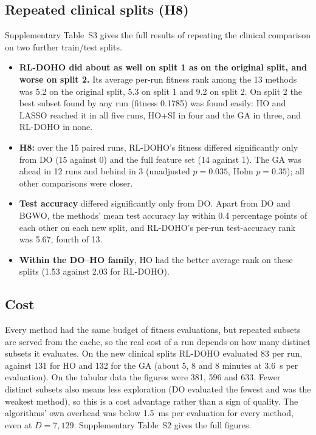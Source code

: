 \documentclass[journal]{IEEEtran}
\begin{document}
\subsection{Repeated clinical splits (H8)}\label{sec:splits}
Supplementary Table~S3 gives the full results of repeating the clinical comparison on two further train/test splits.
\begin{itemize}
\item \textbf{RL-DOHO did about as well on split 1 as on the original split, and worse on split 2.} Its average per-run fitness rank among the 13 methods was 5.2 on the original split, 5.3 on split 1 and 9.2 on split 2. On split 2 the best subset found by any run (fitness 0.1785) was found easily: HO and LASSO reached it in all five runs, HO+SI in four and the GA in three, and RL-DOHO in none.
\item \textbf{H8:} over the 15 paired runs, RL-DOHO's fitness differed significantly only from DO (15 against 0) and the full feature set (14 against 1). The GA was ahead in 12 runs and behind in 3 (unadjusted $p=0.035$, Holm $p=0.35$); all other comparisons were closer.
\item \textbf{Test accuracy} differed significantly only from DO. Apart from DO and BGWO, the methods' mean test accuracy lay within 0.4 percentage points of each other on each new split, and RL-DOHO's per-run test-accuracy rank was 5.67, fourth of 13.
\item \textbf{Within the DO--HO family}, HO had the better average rank on these splits (1.53 against 2.03 for RL-DOHO).
\end{itemize}



\subsection{Cost}
Every method had the same budget of fitness evaluations, but repeated subsets are served from the cache, so the real cost of a run depends on how many distinct subsets it evaluates. On the new clinical splits RL-DOHO evaluated 83 per run, against 131 for HO and 132 for the GA (about 5, 8 and 8 minutes at 3.6~s per evaluation). On the tabular data the figures were 381, 596 and 633. Fewer distinct subsets also means less exploration (DO evaluated the fewest and was the weakest method), so this is a cost advantage rather than a sign of quality. The algorithms' own overhead was below 1.5~ms per evaluation for every method, even at $D=7{,}129$. Supplementary Table~S2 gives the full figures.
\end{document}

